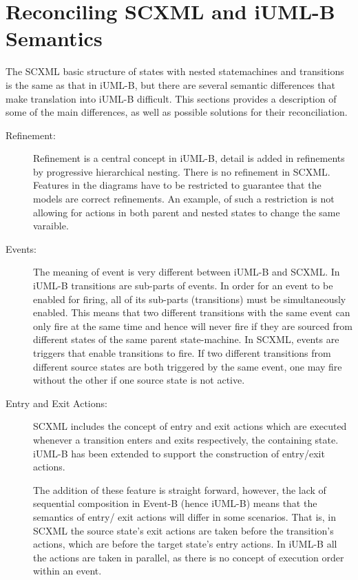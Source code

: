 \section{Reconciling SCXML and iUML-B Semantics}
\label{sect:recon}

The SCXML basic structure of states with nested 
statemachines and transitions is the same as that 
in iUML-B, but there are several semantic 
differences that make translation into iUML-B difficult. 
This sections provides a description of some of the
main differences, as well as possible solutions for their
reconciliation.

\begin{description}
\item [Refinement:]
Refinement is a central concept in iUML-B, detail is 
added in refinements by progressive hierarchical 
nesting. There is no refinement in SCXML. Features
in the diagrams have to be restricted to guarantee
that the models are correct refinements. An example,
of such a restriction is not allowing for actions in 
both parent and nested states to change the same varaible.

\item [Events:]
The meaning of event is very different between iUML-B 
and SCXML. In iUML-B transitions are sub-parts of 
events. In order for an event to be enabled for firing, 
all of its sub-parts (transitions) must be 
simultaneously enabled. This means that two different 
transitions with the same event can only fire at the 
same time and hence will never fire if they are sourced 
from different states of the same parent state-machine. 
In SCXML, events are triggers that enable transitions 
to fire. If two different transitions from different 
source states are both triggered by the same event, one 
may fire without the other if one source state is not 
active.

\item [Entry and Exit Actions:]
SCXML includes the concept of entry and exit actions 
which are executed whenever a transition enters and 
exits respectively, the containing state. 
iUML-B has been extended to support the construction 
of entry/exit actions.

The addition of these feature is straight forward,
however, the lack of sequential composition in 
Event-B (hence iUML-B) means that the semantics of entry/
exit actions will differ in some scenarios. That is, in 
SCXML the source state’s exit actions are taken before the 
transition’s actions, which are before the target state’s 
entry actions. In iUML-B all the actions are taken in 
parallel, as there is no concept of execution order within 
an event. 


\end{description}
